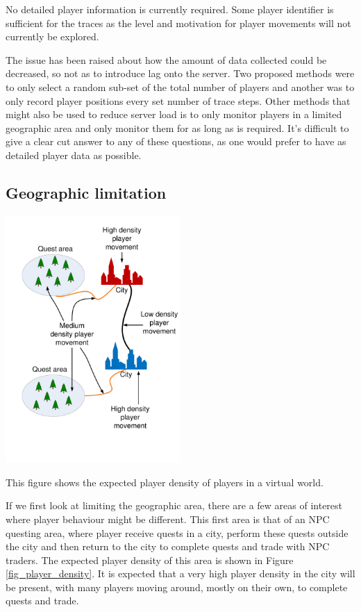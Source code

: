 \documentclass[journal,oneside,a4paper,onecolumn]{IEEEtran}
\begin{document}
No detailed player information is currently required. Some player identifier is sufficient for the traces as the level and motivation for player
movements will not currently be explored.

The issue has been raised about how the amount of data collected could be decreased, so not as to introduce lag onto the server. Two proposed methods
were to only select a random sub-set of the total number of players and another was to only record player positions every set number of trace steps.
Other methods that might also be used to reduce server load is to only monitor players in a limited geographic area and only monitor them for as long
as is required. It's difficult to give a clear cut answer to any of these questions, as one would prefer to have as detailed player data as possible.

\subsection{Geographic limitation}

\begin{floatingfigure}[l]{0.5\textwidth}
\centering
 \includegraphics[width=0.5\textwidth]{Player_density_expectations}
 \caption{This figure shows the expected player density of players in a virtual world.}
 \label{fig_player_density}
\end{floatingfigure}
%
If we first look at limiting the geographic area, there are a few areas of interest where player behaviour might be different. This first area is
that of an NPC questing area, where player receive quests in a city, perform these quests outside the city and then return to the city to complete
quests and trade with NPC traders. The expected player density of this area is shown in Figure \ref{fig_player_density}. It is expected that a very
high player density in the city will be present, with many players moving around, mostly on their own, to complete quests and trade.
\end{document}
